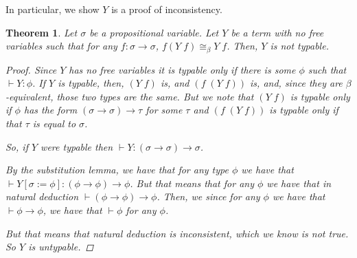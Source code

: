 \documentclass[12pt]{article}
\newtheorem{theorem}{Theorem}
\begin{document}
In particular, we show $Y$ is a proof of inconsistency. 
\begin{theorem}
Let $\sigma$ be a propositional variable. 
Let $Y$ be a term with no free variables such that for any $f\colon \sigma\to\sigma$,
$f(Y\; f) \cong_\beta Y\; f$. 
Then, $Y$ is not typable.
\begin{proof}
Since $Y$ has no free variables it is typable only if there is some $\phi$
such that $\vdash Y:\phi$. 
If $Y$ is typable, then, $(Y\; f)$ is, and $(f\;(Y\; f))$ is, and, since
they are $\beta$-equivalent, those two types are the same. 
But we note that $(Y\; f)$ is typable only if $\phi$ has the form 
$(\sigma\to\sigma)\to\tau$ for some $\tau$ and $(f\; (Y\; f))$ is 
typable only if that $\tau$ is equal to $\sigma$. 

So, if $Y$ were typable then $\vdash Y: (\sigma\to\sigma)\to\sigma$.

By the substitution lemma, we have that for any type $\phi$ we have that
$\vdash Y[\sigma:=\phi] : (\phi\to\phi)\to\phi$. 
But that means that for any $\phi$ we have that in natural deduction
$\vdash (\phi\to\phi)\to\phi$. 
Then, we since for any $\phi$ we have that $\vdash\phi\to\phi$,
we have that $\vdash\phi$ for any $\phi$.

But that means that natural deduction is inconsistent, which we know is not true.
So $Y$ is untypable. 
\end{proof} 
\end{theorem}
\end{document}
